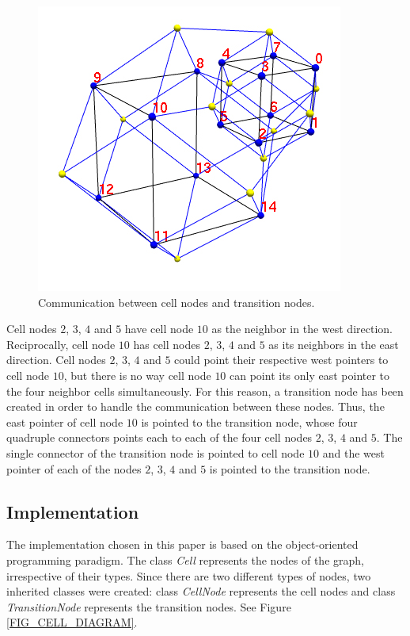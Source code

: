 \begin{figure}[H]
    \centering
    \includegraphics[scale=0.6,angle=0]{../img/refinedGraph.jpg}
    \caption{Communication between cell nodes and transition nodes.}
    \label{FIG_REFINED_GRAPH}
\end{figure}

Cell nodes $2$, $3$, $4$ and $5$ have cell node $10$ as the neighbor
in the west direction. Reciprocally, cell node $10$ has cell nodes
$2$, $3$, $4$ and $5$ as its neighbors in the east direction. Cell
nodes $2$, $3$, $4$ and $5$ could point their respective west
pointers to cell node $10$, but there is no way cell node $10$ can
point its only east pointer to the four neighbor cells
simultaneously. For this reason, a transition node has been created
in order to handle the communication between these nodes. Thus, the
east pointer of cell node $10$ is pointed to the transition node,
whose four quadruple connectors points each to each of the four cell
nodes $2$, $3$, $4$ and $5$. The single connector of the transition
node is pointed to cell node $10$ and the west pointer of each of
the nodes $2$, $3$, $4$ and $5$ is pointed to the transition node.

\subsection{Implementation}
The implementation chosen in this paper is based on the
object-oriented programming paradigm. The class \textit{Cell}
represents the nodes of the graph, irrespective of their types.
Since there are two different types of nodes, two inherited classes
were created: class \textit{CellNode} represents the cell nodes and
class \textit{TransitionNode} represents the transition nodes. See
Figure \ref{FIG_CELL_DIAGRAM}.

